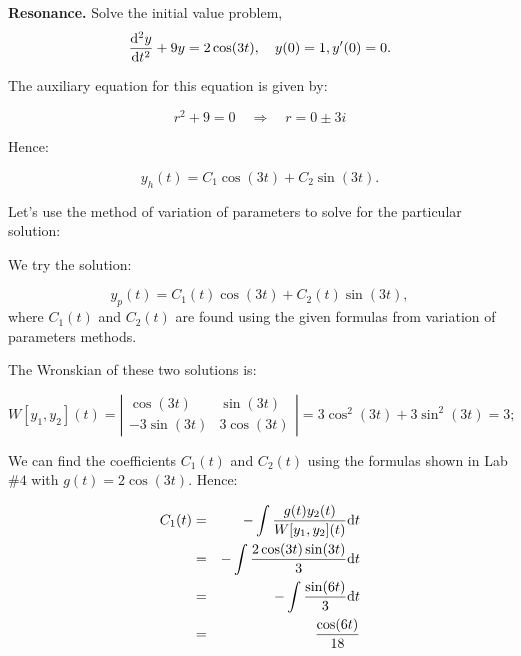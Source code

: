 \documentclass[11pt]{article}
\begin{document}
\begin{problem}
{\bf Resonance.} Solve the initial value problem,
\begin{equation*}
\dfrac{{\rm d}^2 y}{{\rm d} t^2} + 9y = 2 \cos(3t), \quad y(0) =1 , y^{\prime}(0) =0.
\end{equation*}
\end{problem}
\begin{solution}
The auxiliary equation for this equation is given by:

\begin{equation*}
r^2 + 9 =0 \quad \Rightarrow \quad r = 0 \pm 3 i
\end{equation*}

Hence:

\begin{equation*}
y_{h}(t) = C_{1} \cos(3 t) + C_{2} \sin(3 t).
\end{equation*}

Let's use the method of variation of parameters to solve for the particular solution:

We try the solution:

\begin{equation*}
y_{p}(t) = C_{1}(t) \cos(3 t) + C_{2}(t) \sin(3 t),
\end{equation*}
where $C_{1}(t)$ and $ C_{2}(t)$ are found using the given formulas from variation of parameters methods.

The Wronskian of these two solutions is:

\begin{equation*}
W[y_{1},y_{2}](t) = \left| \begin{array}{cc} \cos(3 t) & \sin(3 t)\\
-3\sin(3 t) & 3\cos(3 t) \end{array} \right| = 3 \cos^{2}(3 t) + 3\sin^{2}(3 t) = 3;
\end{equation*}

We can find the coefficients $C_{1}(t)$ and $C_{2}(t)$ using  the formulas shown in Lab $\# 4$ with $g(t) = 2 \cos(3t)$.
Hence:

\begin{eqnarray*}
C_{1}(t) & = & - \int \dfrac{g(t) y_{2}(t)}{W[y_{1},y_{2}](t)} {\rm d} t \\
& = & - \int \dfrac{2 \cos(3t)\sin(3t) }{3} {\rm d} t \\
& = & - \int \dfrac{\sin(6t) }{3} {\rm d} t \\
& = & \dfrac{\cos(6t) }{18}
\end{eqnarray*}


\end{solution}
\end{document}
